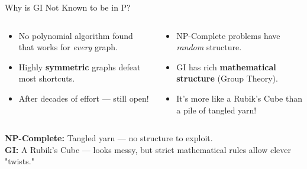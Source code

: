 \documentclass[10pt, aspectratio=169]{beamer}
\newcommand{\faQuestion}{?}
\newcommand{\faCubes}{$\boxplus$}
\begin{document}
\begin{frame}{Why is GI \alert{Not Known} to be in P?}
	\begin{columns}[T]
		\begin{tcolorbox}[redbox, title={\faQuestion\; Why Not Easy (P)?}]
			\begin{itemize}
				\item No polynomial algorithm found that works for \textit{every} graph.
				\item Highly \textbf{symmetric} graphs defeat most shortcuts.
				\item After decades of effort — still open!
			\end{itemize}
		\end{tcolorbox}

		\begin{tcolorbox}[greenbox, title={\faQuestion\; Why Not Hard (NP-Complete)?}]
			\begin{itemize}
				\item NP-Complete problems have \textit{random} structure.
				\item GI has rich \textbf{mathematical structure} (Group Theory).
				\item It's more like a Rubik's Cube than a pile of tangled yarn!
			\end{itemize}
		\end{tcolorbox}
	\end{columns}

	\vspace{0.8em}
	\begin{tcolorbox}[keybox, title={\faCubes\; The Rubik's Cube Analogy}]
		\begin{columns}
			\textbf{NP-Complete:} Tangled yarn — no structure to exploit.\\[0.3em]
			\textbf{GI:} A Rubik's Cube — looks messy, but strict mathematical rules allow clever "twists."
			\centering
		\end{columns}
	\end{tcolorbox}
\end{frame}
\end{document}
